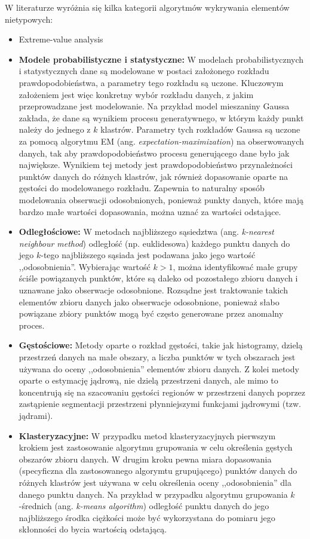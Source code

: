 \documentclass[12pt,a4paper,oneside]{book}
\theoremstyle{definition}
\begin{document}
W literaturze wyróżnia się kilka kategorii algorytmów wykrywania elementów nietypowych:
\begin{itemize}
\item Extreme-value analysis
\item \textbf{Modele probabilistyczne i statystyczne:} W modelach probabilistycznych i statystycznych dane są modelowane w postaci założonego rozkładu prawdopodobieństwa, a parametry tego rozkładu są uczone. Kluczowym założeniem jest więc konkretny wybór rozkładu danych, z jakim przeprowadzane jest modelowanie. Na przykład model mieszaniny Gaussa zakłada, że dane są wynikiem procesu generatywnego, w którym każdy punkt należy do jednego z $k$ klastrów. Parametry tych rozkładów Gaussa są uczone za pomocą algorytmu EM (ang. \textit{expectation-maximization}) na obserwowanych danych, tak aby prawdopodobieństwo procesu generującego dane było jak największe. Wynikiem tej metody jest prawdopodobieństwo przynależności punktów danych do różnych klastrów, jak również dopasowanie oparte na gęstości do modelowanego rozkładu. Zapewnia to naturalny sposób modelowania obserwacji odosobnionych, ponieważ punkty danych, które mają bardzo małe wartości dopasowania, można uznać za wartości odstające.
\item \textbf{Odległościowe:} W metodach najbliższego sąsiedztwa (ang. \textit{k-nearest neighbour method}) odległość (np. euklidesowa) każdego punktu danych do jego $k$-tego najbliższego sąsiada jest podawana jako jego wartość ,,odosobnienia''. Wybierając wartość $k > 1$, można identyfikować małe grupy ściśle powiązanych punktów, które są daleko od pozostałego zbioru danych i uznawane jako obserwacje odosobnione. Rozsądne jest traktowanie takich elementów zbioru danych jako obserwacje odosobnione, ponieważ słabo powiązane zbiory punktów mogą być często generowane przez anomalny proces.
\item \textbf{Gęstościowe:} Metody oparte o rozkład gęstości, takie jak histogramy, dzielą przestrzeń danych na małe obszary, a liczba punktów w tych obszarach jest używana do oceny ,,odosobnienia'' elementów zbioru danych. Z kolei metody oparte o estymację jądrową, nie dzielą przestrzeni danych, ale mimo to koncentrują się na szacowaniu gęstości regionów w przestrzeni danych poprzez zastąpienie segmentacji przestrzeni płynniejszymi funkcjami jądrowymi (tzw. jądrami).
\item \textbf{Klasteryzacyjne:} W przypadku metod klasteryzacyjnych pierwszym krokiem jest zastosowanie algorytmu grupowania w celu określenia gęstych obszarów zbioru danych. W drugim kroku pewna miara dopasowania (specyficzna dla zastosowanego algorymtu grupującego) punktów danych do różnych klastrów jest używana w celu określenia oceny ,,odosobnienia'' dla danego punktu danych. Na przykład w przypadku algorytmu grupowania $k$-średnich (ang. \textit{k-means algorithm}) odległość punktu danych do jego najbliższego środka ciężkości może być wykorzystana do pomiaru jego skłonności do bycia wartością odstającą.
\end{itemize}
\end{document}

